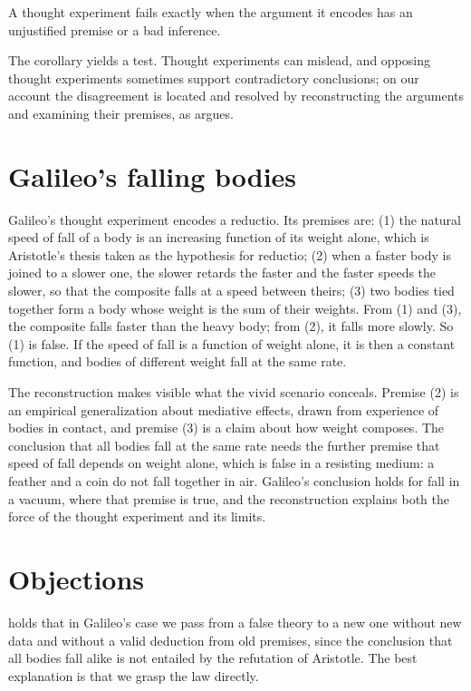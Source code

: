 \documentclass{situationist-preprint}
\begin{document}
\begin{corollary}\label{c:fail}
A thought experiment fails exactly when the argument it encodes has an unjustified premise or a bad inference.
\end{corollary}

The corollary yields a test. Thought experiments can mislead, and opposing thought experiments sometimes support contradictory conclusions; on our account the disagreement is located and resolved by reconstructing the arguments and examining their premises, as \citet{Norton2004} argues.

\section{Galileo's falling bodies}

Galileo's thought experiment encodes a reductio. Its premises are: (1) the natural speed of fall of a body is an increasing function of its weight alone, which is Aristotle's thesis taken as the hypothesis for reductio; (2) when a faster body is joined to a slower one, the slower retards the faster and the faster speeds the slower, so that the composite falls at a speed between theirs; (3) two bodies tied together form a body whose weight is the sum of their weights. From (1) and (3), the composite falls faster than the heavy body; from (2), it falls more slowly. So (1) is false. If the speed of fall is a function of weight alone, it is then a constant function, and bodies of different weight fall at the same rate.

The reconstruction makes visible what the vivid scenario conceals. Premise (2) is an empirical generalization about mediative effects, drawn from experience of bodies in contact, and premise (3) is a claim about how weight composes. The conclusion that all bodies fall at the same rate needs the further premise that speed of fall depends on weight alone, which is false in a resisting medium: a feather and a coin do not fall together in air. Galileo's conclusion holds for fall in a vacuum, where that premise is true, and the reconstruction explains both the force of the thought experiment and its limits.

\section{Objections}

\begin{objection}[Platonism]
\citet{Brown1991,Brown2004} holds that in Galileo's case we pass from a false theory to a new one without new data and without a valid deduction from old premises, since the conclusion that all bodies fall alike is not entailed by the refutation of Aristotle. The best explanation is that we grasp the law directly.
\end{objection}
\end{document}

